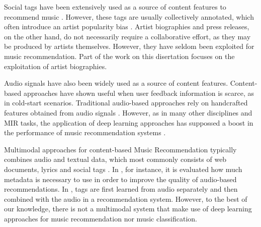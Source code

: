 Social tags have been extensively used as a source of content features to recommend music \citep{Knees2013}. However, these tags are usually collectively annotated, which often introduce an artist popularity bias \citep{Turnbull2008}.
Artist biographies and press releases, on the other hand, do not necessarily require a collaborative effort, as they may be produced by artists themselves. 
However, they have seldom been exploited for music recommendation.
Part of the work on this disertation focuses on the exploitation of artist biographies.

Audio signals have also been widely used as a source of content features. Content-based approaches have shown useful when user feedback information is scarce, as in cold-start scenarios. Traditional audio-based approaches rely on handcrafted features obtained from audio signals \citep{Bogdanov2013}. However, as in many other disciplines and MIR tasks, the application of deep learning approaches has suppossed a boost in the performance of music recommendation systems \citep{Oord2013}. %


Multimodal approaches for content-based Music Recommendation typically combines audio and textual data, which most commonly consists of web documents, lyrics and social tags \citep{liem2011need}. In \citep{Bogdanov2011}, for instance, it is evaluated how much metadata is necessary to use in order to improve the quality of audio-based recommendations. In \citep{Eck:NIPS2007}, tags are first learned from audio separately and then combined with the audio in a recommendation system. 
However, to the best of our knowledge, there is not a multimodal system that make use of deep learning approaches for music recommendation nor music classification.

